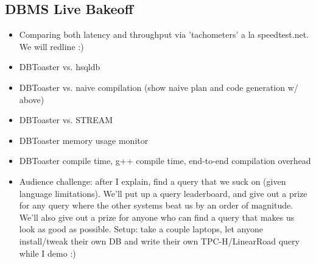 \documentclass{vldb}
\begin{document}
\subsection{DBMS Live Bakeoff}
\begin{itemize}
  \item Comparing both latency and throughput via 'tachometers' a la
  speedtest.net. We will redline :) 
  \item DBToaster vs. hsqldb
  \item DBToaster vs. naive compilation (show naive plan and code generation w/
  above)
  \item DBToaster vs. STREAM
  \item DBToaster memory usage monitor
  \item DBToaster compile time, g++ compile time, end-to-end compilation
  overhead
  \item Audience challenge: after I explain, find a query that we suck on (given
  language limitations). We'll put up a query leaderboard, and give out a prize
  for any query where the other systems beat us by an order of magnitude.
  We'll also give out a prize for anyone who can find a query that makes us
  look as good as possible. Setup: take a couple laptops, let anyone
  install/tweak their own DB and write their own TPC-H/LinearRoad query while I
  demo :)
\end{itemize}

\footnotesize{


}
\end{document}
